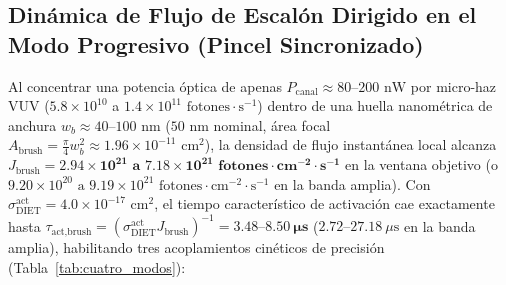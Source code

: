 \documentclass[10pt,twocolumn,a4paper]{article}
\begin{document}
\subsection{Dinámica de Flujo de Escalón Dirigido en el Modo Progresivo (Pincel Sincronizado)}
Al concentrar una potencia óptica de apenas $P_{\text{canal}} \approx 80\text{--}200\text{ nW}$ por micro-haz VUV ($5.8 \times 10^{10}$ a $1.4 \times 10^{11}\text{ fotones}\cdot\text{s}^{-1}$) dentro de una huella nanométrica de anchura $w_b \approx 40\text{--}100\text{ nm}$ ($50\text{ nm}$ nominal, área focal $A_{\text{brush}} = \frac{\pi}{4}w_b^2 \approx 1.96 \times 10^{-11}\text{ cm}^2$), la densidad de flujo instantánea local alcanza $J_{\text{brush}} = \mathbf{2.94 \times 10^{21}\text{ a }7.18 \times 10^{21}\text{ fotones}\cdot\text{cm}^{-2}\cdot\text{s}^{-1}}$ en la ventana objetivo (o $9.20 \times 10^{20}\text{ a }9.19 \times 10^{21}\text{ fotones}\cdot\text{cm}^{-2}\cdot\text{s}^{-1}$ en la banda amplia). Con $\sigma_{\text{DIET}}^{\text{act}} = 4.0 \times 10^{-17}\text{ cm}^2$, el tiempo característico de activación cae exactamente hasta $\tau_{\text{act,brush}} = (\sigma_{\text{DIET}}^{\text{act}} J_{\text{brush}})^{-1} = \mathbf{3.48\text{--}8.50\ \mu\text{s}}$ ($2.72\text{--}27.18\ \mu\text{s}$ en la banda amplia), habilitando tres acoplamientos cinéticos de precisión (Tabla~\ref{tab:cuatro_modos}):
\end{document}
